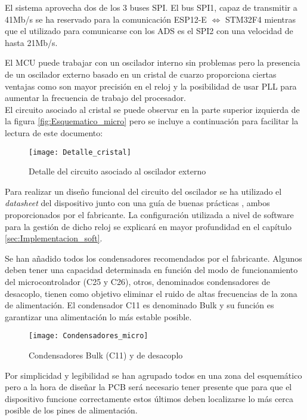 \clearpage

El sistema aprovecha dos de los 3 buses \acrshort{SPI}. El bus SPI1, capaz de transmitir a 41Mb/s se ha reservado para la comunicación ESP12-E $\Longleftrightarrow$ STM32F4 mientras que el utilizado para comunicarse con los ADS es el SPI2 con una velocidad de hasta 21Mb/s.

El \acrshort{MCU} puede trabajar con un oscilador interno sin problemas pero la presencia de un oscilador externo basado en un cristal de cuarzo proporciona ciertas ventajas como son mayor precisión en el reloj y la posibilidad de usar \acrshort{PLL} para aumentar la frecuencia de trabajo del procesador.
\\El circuito asociado al cristal se puede observar en la parte superior izquierda de la figura \ref{fig:Esquematico_micro} pero se incluye a continuación para facilitar la lectura de este documento:

\begin{figure} [h]
    \centering
    \texttt{[image: Detalle\_cristal]}
    \caption{Detalle del circuito asociado al oscilador externo}
    \label{fig:Detalle_cristal}
\end{figure}


Para realizar un diseño funcional del circuito del oscilador se ha utilizado el \textit{datasheet} del dispositivo junto con una guía de buenas prácticas \cite{Guia_Oscilador}, ambos proporcionados por el fabricante. La configuración utilizada a nivel de software para la gestión de dicho reloj se explicará en mayor profundidad en el capítulo \ref{sec:Implementacion_soft}.

Se han añadido todos los condensadores recomendados por el fabricante. Algunos deben tener una capacidad determinada en función del modo de funcionamiento del microcontrolador (C25 y C26), otros, denominados condensadores de desacoplo, tienen como objetivo eliminar el ruido de altas frecuencias de la zona de alimentación. El condensador C11 es denominado Bulk y su función es garantizar una alimentación lo más estable posible.

\begin{figure} [h]
    \centering
    \texttt{[image: Condensadores\_micro]}
    \caption{Condensadores Bulk (C11) y de desacoplo}
    \label{fig:Condensadores_micro}
\end{figure}

 Por simplicidad y legibilidad se han agrupado todos en una zona del esquemático pero a la hora de diseñar la PCB será necesario tener presente que para que el dispositivo funcione correctamente estos últimos deben localizarse lo más cerca posible de los pines de alimentación.

